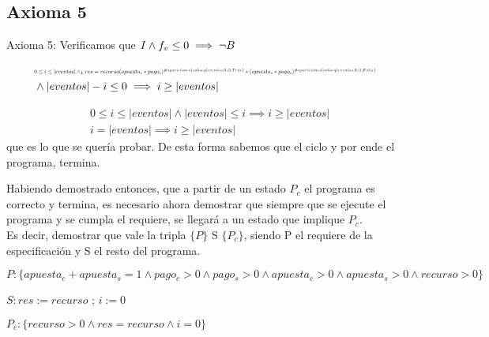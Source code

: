 \documentclass[10pt,a4paper]{article}
\begin{document}
\vspace{0.3cm}

\subsection{Axioma 5}

Axioma 5: Verificamos que ${\it I} \land f_v \leq 0 \implies \neg B$

\begin{equation}
    \begin{split}
        &\resizebox{.9\hsize}{!}{$0 \leq i \leq |eventos| \yLuego res = recurso(apuesta_c * pago_c)^{\#apariciones(subseq(eventos,0,i),True)}*(apuesta_s * pago_s)^{\#apariciones(subseq(eventos,0,i),False)}$} \\
        &\land |eventos| - i \leq 0 \implies i \geq |eventos|
    \end{split}
\end{equation}

\begin{equation}
    \begin{split}
        &0 \leq i \leq |eventos| \land |eventos| \leq i \implies i \geq |eventos| \\
        &i = |eventos| \implies i \geq |eventos|
    \end{split}
\end{equation}
que es lo que se quería probar. De esta forma sabemos que el ciclo y por ende el programa, termina.

\newpage

Habiendo demostrado entonces, que a partir de un estado $P_c$ el programa es correcto y termina, es necesario ahora demostrar que siempre que se ejecute el programa y se cumpla el requiere,
se llegará a un estado que implique $P_c$. \\
Es decir, demostrar que vale la tripla $\{P\}$ S $\{P_c\}$, siendo P el requiere de la especificación y S el resto del programa.

\vspace{0.3cm}

$P:\{apuesta_c + apuesta_s = 1 \land pago_c > 0 \land pago_s > 0 \land apuesta_c > 0 \land apuesta_s > 0 \land recurso > 0\}$

\vspace{0.3cm}

$S:res := recurso$ ; $i := 0$

\vspace{0.3cm}

$P_c:\{recurso > 0 \land res = recurso \land i = 0\}$
\end{document}
